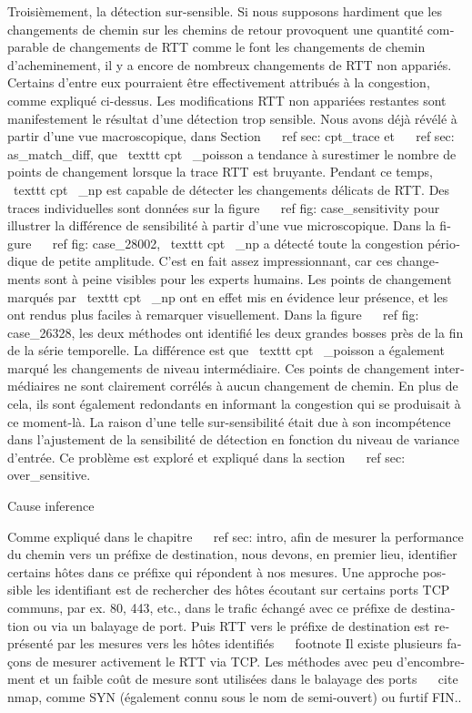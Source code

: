 \begin{otherlanguage}{french}
{{{Troisièmement, la détection sur-sensible.
Si nous supposons hardiment que les changements de chemin sur les chemins de retour provoquent une quantité comparable de changements de RTT comme le font les changements de chemin d'acheminement, il y a encore de nombreux changements de RTT non appariés.
Certains d'entre eux pourraient être effectivement attribués à la congestion, comme expliqué ci-dessus.
Les modifications RTT non appariées restantes sont manifestement le résultat d'une détection trop sensible.
Nous avons déjà révélé à partir d'une vue macroscopique, dans Section ~ \ ref {sec: cpt_trace} et ~ \ ref {sec: as_match_diff}, que \ texttt {cpt \ _poisson} a tendance à surestimer le nombre de points de changement lorsque la trace RTT est bruyante.
Pendant ce temps, \ texttt {cpt \ _np} est capable de détecter les changements délicats de RTT.
Des traces individuelles sont données sur la figure ~ \ ref {fig: case_sensitivity} pour illustrer la différence de sensibilité à partir d'une vue microscopique.
Dans la figure ~ \ ref {fig: case_28002}, \ texttt {cpt \ _np} a détecté toute la congestion périodique de petite amplitude.
C'est en fait assez impressionnant, car ces changements sont à peine visibles pour les experts humains.
Les points de changement marqués par \ texttt {cpt \ _np} ont en effet mis en évidence leur présence, et les ont rendus plus faciles à remarquer visuellement.
Dans la figure ~ \ ref {fig: case_26328}, les deux méthodes ont identifié les deux grandes bosses près de la fin de la série temporelle.
La différence est que \ texttt {cpt \ _poisson} a également marqué les changements de niveau intermédiaire.
Ces points de changement intermédiaires ne sont clairement corrélés à aucun changement de chemin.
En plus de cela, ils sont également redondants en informant la congestion qui se produisait à ce moment-là.
La raison d'une telle sur-sensibilité était due à son incompétence dans l'ajustement de la sensibilité de détection en fonction du niveau de variance d'entrée. Ce problème est exploré et expliqué dans la section ~ \ ref {sec: over_sensitive}.

Cause inference

Comme expliqué dans le chapitre ~ \ ref {sec: intro}, afin de mesurer la performance du chemin vers un préfixe de destination, nous devons, en premier lieu, identifier certains hôtes dans ce préfixe qui répondent à nos mesures.
Une approche possible les identifiant est de rechercher des hôtes écoutant sur certains ports TCP communs, par ex. 80, 443, etc., dans le trafic échangé avec ce préfixe de destination ou via un balayage de port.
Puis RTT vers le préfixe de destination est représenté par les mesures vers les hôtes identifiés ~ \ footnote {Il existe plusieurs façons de mesurer activement le RTT via TCP. Les méthodes avec peu d'encombrement et un faible coût de mesure sont utilisées dans le balayage des ports ~ \ cite {nmap}, comme SYN (également connu sous le nom de semi-ouvert) ou furtif FIN.}.

}}}
\end{otherlanguage}
